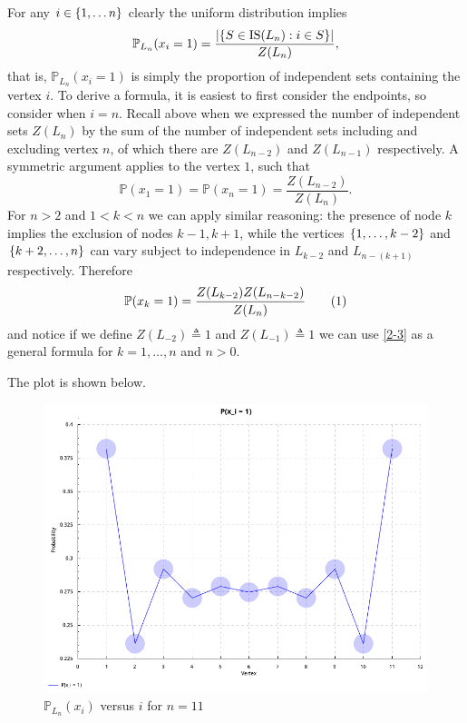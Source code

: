 \documentclass{article}
\newcommand{\prob}{\mathbb{P}}
\begin{document}
\begin{homeworkProblem}
For any $i \in \qty{1,\ldots n}$ clearly the uniform distribution implies
\[
  \prob_{L_n}(x_i = 1) = \frac{\abs{\qty{S \in \mathrm{IS}(L_n): i \in S}}}{Z(L_n)},
\]
that is, $\prob_{L_n}(x_i = 1)$ is simply the proportion of independent sets
containing the vertex $i$. To derive a formula, it is easiest to first consider
the endpoints, so consider when $i=n$. Recall above when we expressed the
number of independent sets
$Z(L_n)$ by the sum of the number of independent sets including and
excluding vertex $n$, of which there are $Z(L_{n-2})$ and $Z(L_{n-1})$
respectively. A symmetric argument applies to the vertex $1$, such that
\[
  \prob(x_1 = 1) = \prob(x_n = 1) = \frac{Z(L_{n-2})}{Z(L_n)}.
\]
For $n>2$ and $1 < k < n$ we can apply similar reasoning: the presence of node
$k$ implies the exclusion of nodes $k-1, k+1$, while the vertices
$\qty{1,\ldots,k-2}$ and $\qty{k+2,\ldots,n}$ can vary subject to independence
in $L_{k-2}$ and $L_{n-(k+1)}$ respectively. Therefore
\[
  \prob(x_k = 1) =
  \frac{
    Z(L_{k-2}) Z(L_{n-k-2})
  }{
    Z(L_n)
  }
  \numberthis \label{2-3}
\]
and notice if we define $Z(L_{-2}) \triangleq 1$ and $Z(L_{-1}) \triangleq 1$ we
can use \eqref{2-3} as a general formula for $k=1,\ldots,n$ and $n>0$.

\pagebreak

The plot is shown below.

\begin{figure}[h!]
\begin{center}
  \includegraphics[width=\linewidth]{problem_2-3-c.png}
\end{center}
\caption{$\prob_{L_n}(x_i)$ versus $i$ for $n=11$}
\label{fig:2-3-c}
\end{figure}


\end{homeworkProblem}
\end{document}
